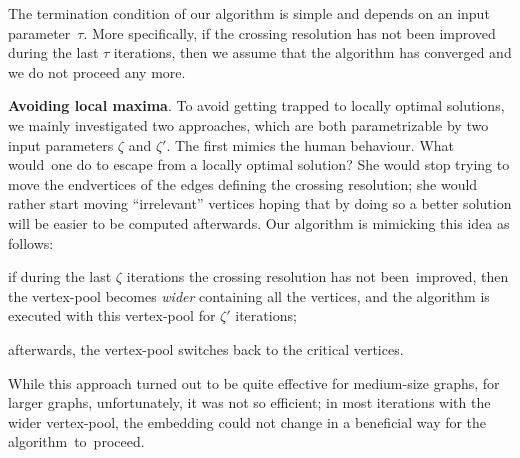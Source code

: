 \documentclass[runningheads]{llncs}
\newcommand{\myparagraph}[1]{\smallskip\noindent\textbf{#1}.}
\begin{document}
The termination condition of our algorithm is simple and depends on an input parameter~$\tau$. More specifically, if the crossing resolution has not been improved during the last $\tau$ iterations, then we assume that the algorithm has converged and we do not proceed any more.

\myparagraph{Avoiding local maxima}
%
To avoid getting trapped to locally optimal solutions, we mainly investigated two approaches, which are both  parametrizable by two input parameters $\zeta$ and $\zeta'$. The first mimics the human behaviour. What would~one do to escape from a locally optimal solution? She would stop trying to move the endvertices of the edges defining the crossing resolution; she would rather start moving ``irrelevant'' vertices hoping that 
by doing so a better solution will be easier to be computed afterwards. Our algorithm is mimicking this idea as follows: 
%
\begin{inparaenum}[(i)]
\item if during the last $\zeta$ iterations the crossing resolution has not been~improved, then the vertex-pool becomes \emph{wider} containing all the vertices, and the algorithm is executed with this vertex-pool for $\zeta'$ iterations;
\item afterwards, the vertex-pool switches back to the critical vertices.
\end{inparaenum}
%
While this approach turned out to be quite effective for medium-size graphs, for larger graphs, unfortunately, it was not so efficient; in most iterations with the wider vertex-pool, the embedding could not change in a beneficial way for the algorithm~to~proceed.

\end{document}
